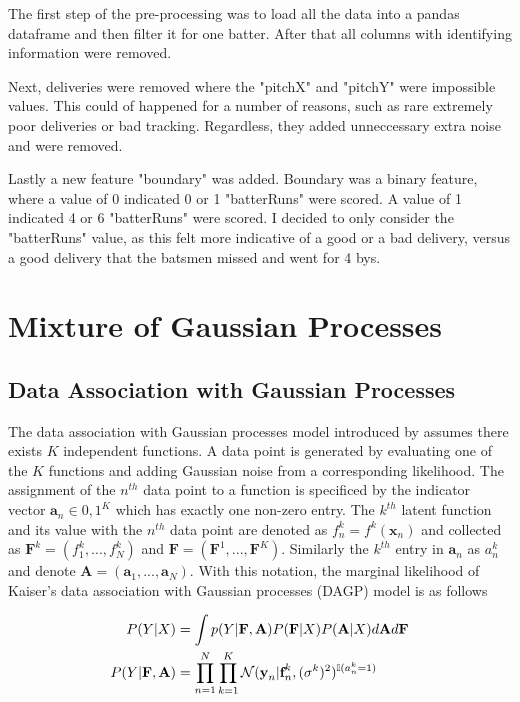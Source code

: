 \documentclass[12pt,a4paper]{report}
\theoremstyle{definition}
\begin{document}
The first step of the pre-processing was to load all the data into a pandas dataframe and then filter it for one batter.
After that all columns with identifying information were removed.

Next, deliveries were removed where the "pitchX" and "pitchY" were impossible values. 
This could of happened for a number of reasons, such as rare extremely poor deliveries or bad tracking.
Regardless, they added unneccessary extra noise and were removed.

Lastly a new feature "boundary" was added. 
Boundary was a binary feature, where a value of 0 indicated 0 or 1 "batterRuns" were scored.
A value of 1 indicated 4 or 6 "batterRuns" were scored. 
I decided to only consider the "batterRuns" value, as this felt more indicative of a good or a bad delivery, versus a good delivery that the batsmen missed and went for 4 bys.

\section{Mixture of Gaussian Processes}

\subsection{Data Association with Gaussian Processes}

The data association with Gaussian processes model introduced by \citet{Kaiser2018} assumes there exists $K$ independent functions.
A data point is generated by evaluating one of the $K$ functions and adding Gaussian noise from a corresponding likelihood.
The assignment of the $n^{th}$ data point to a function is specificed by the indicator vector $\textbf{a}_{n} \in {0, 1}^K$ which has exactly one non-zero entry.
The $k^{th}$ latent function and its value with the $n^{th}$ data point are denoted as $f_{n}^k = f^k(\textbf{x}_{n})$ and collected as $\textbf{F}^k = (f_{1}^k, ... , f_{N}^k)$ and $\textbf{F} = (\textbf{F}^1, ... , \textbf{F}^K)$.
Similarly the $k^{th}$ entry in $\textbf{a}_{n}$ as $a_{n}^k$ and denote $\textbf{A} = (\textbf{a}_{1}, ... , \textbf{a}_{N})$.
With this notation, the marginal likelihood of Kaiser's data association with Gaussian processes (DAGP) model is as follows

\begin{equation}
	\begin{aligned}
		\centering 
		P(Y | X) &= \int p(Y | \textbf{F}, \textbf{A}) P(\textbf{F} | X) P(\textbf{A} | X) d\textbf{A}d\textbf{F} \\
		P(Y | \textbf{F}, \textbf{A}) &= \prod_{n=1}^{N} \prod_{k=1}^{K} \mathcal{N}(\textbf{y}_{n} | \textbf{f}_{n}^k, (\sigma^k)^2)^{\mathbb{I}(a_{n}^k = 1)}
	\end{aligned}
\end{equation}
\end{document}
